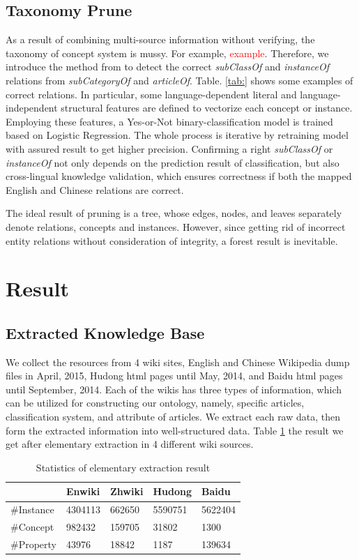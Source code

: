 \documentclass[runningheads,a4paper]{llncs}
\begin{document}
\subsection{Taxonomy Prune}
\label{sec:tp}
As a result of combining multi-source information without verifying, the taxonomy of concept system is mussy. For example, \textcolor{red}{example}. Therefore, we introduce the method from\cite{wang2014cross} to detect the correct \textit{subClassOf} and \textit{instanceOf} relations from \textit{subCategoryOf} and \textit{articleOf}. Table. \ref{tab:} shows some examples of correct relations. In particular, some language-dependent literal and language-independent structural features are defined to vectorize each concept or instance. Employing these features, a Yes-or-Not binary-classification model is trained based on Logistic Regression. The whole process is iterative by retraining model with assured result to get higher precision. Confirming a right \textit{subClassOf} or \textit{instanceOf} not only depends on the prediction result of classification, but also cross-lingual knowledge validation, which ensures correctness if both the mapped English and Chinese relations are correct. 

The ideal result of pruning is a tree, whose edges, nodes, and leaves separately denote relations, concepts and instances. However, since getting rid of incorrect entity relations without consideration of integrity, a forest result is inevitable. 

\section{Result}
\label{sec:result}

\subsection{Extracted Knowledge Base}
We collect the resources from 4 wiki sites, English and Chinese Wikipedia dump files in April, 2015, Hudong html pages until May, 2014, and Baidu html pages until September, 2014. Each of the wikis has three types of information, which can be utilized for constructing our ontology, namely, specific articles, classification system, and attribute of articles. We extract each raw data, then form the extracted information into well-structured data. Table \ref{tab:extract-result} the result we get after elementary extraction in 4 different wiki sources.

\begin{table}[h]
\small
\centering
\caption{Statistics of elementary extraction result}
\label{tab:extract-result}
    \begin{tabular}{|l|l|l|l|l|}
        \hline
                 & Enwiki  & Zhwiki & Hudong  & Baidu   \\ \hline
        \#Instance & 4304113 & 662650 & 5590751 & 5622404 \\ \hline
        \#Concept  & 982432  & 159705 & 31802   & 1300    \\ \hline
        \#Property & 43976   & 18842  & 1187    & 139634  \\ \hline
    \end{tabular}
\end{table}
\end{document}
